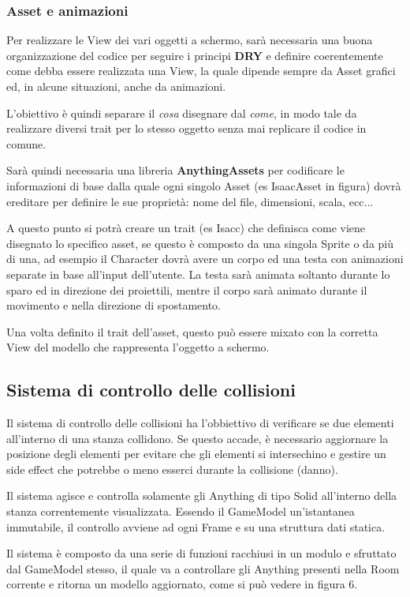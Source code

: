 \subsubsection{Asset e animazioni}

Per realizzare le View dei vari oggetti a schermo, sarà necessaria una buona organizzazione del codice 
per seguire i principi \textbf{DRY} e definire coerentemente come debba essere realizzata una View, 
la quale dipende sempre da Asset grafici ed, in alcune situazioni, anche da animazioni. 

L'obiettivo è quindi separare il \textit{cosa} disegnare dal \textit{come}, 
in modo tale da realizzare diversi trait per lo stesso oggetto senza mai replicare il codice in comune.

Sarà quindi necessaria una libreria \textbf{AnythingAssets} per codificare le informazioni di base 
dalla quale ogni singolo Asset (es IsaacAsset in figura) dovrà ereditare per definire le sue proprietà: 
nome del file, dimensioni, scala, ecc...

A questo punto si potrà creare un trait (es Isacc) che definisca come viene disegnato lo specifico asset, 
se questo è composto da una singola Sprite o da più di una, 
ad esempio il Character dovrà avere un corpo ed una testa con animazioni separate in base all'input dell'utente. 
La testa sarà animata soltanto durante lo sparo ed in direzione dei proiettili, 
mentre il corpo sarà animato durante il movimento e nella direzione di spostamento.

Una volta definito il trait dell'asset, questo può essere mixato con la corretta View del modello che rappresenta l'oggetto a schermo.

\subsection{Sistema di controllo delle collisioni}
Il sistema di controllo delle collisioni ha l'obbiettivo di verificare se due elementi all'interno di una stanza collidono. 
Se questo accade, è necessario aggiornare la posizione degli elementi per evitare che gli elementi si intersechino e gestire un side effect che potrebbe o meno esserci durante la collisione (danno). 

Il sistema agisce e controlla solamente gli Anything di tipo Solid all'interno della stanza correntemente visualizzata.
Essendo il GameModel un'istantanea immutabile, il controllo avviene ad ogni Frame e su una struttura dati statica. 

Il sistema è composto da una serie di funzioni racchiusi in un modulo e sfruttato dal GameModel stesso, il quale va a controllare gli Anything presenti nella Room corrente e ritorna un modello aggiornato, come si può vedere in figura 6.

